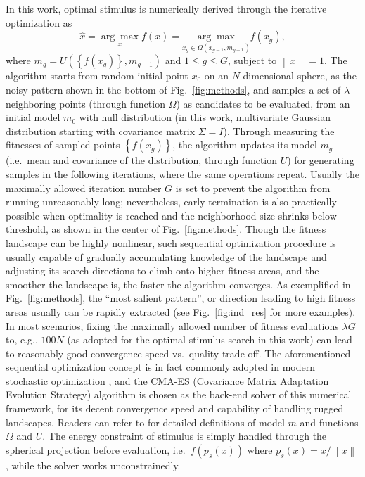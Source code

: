 In this work, optimal stimulus is numerically derived through the iterative optimization as \begin{equation} \label{eq:O1} \hat{x} = \underset{x} {\arg\max} f\left(x\right) = \underset{x_{g} \in \Omega \left( x_{g-1} , m_{g-1} \right)}{\arg\max} f\left(x_{g}\right),\end{equation} where $m_{g}=U\left(\left\lbrace f\left(x_{g}\right) \right\rbrace , m_{g-1}\right)$ and $1 \le g \le G$, subject to $\left\| x \right\| = 1$. The algorithm starts from random initial point $x_{0}$ on an $N$ dimensional sphere, as the noisy pattern shown in the bottom of Fig.~\ref{fig:methods}, and samples a set of $\lambda$ neighboring points (through function $\Omega$) as candidates to be evaluated, from an initial model $m_{0}$ with null distribution (in this work, multivariate Gaussian distribution starting with covariance matrix $\Sigma = I$). Through measuring the fitnesses of sampled points $\left\lbrace f\left(x_{g}\right) \right\rbrace$, the algorithm updates its model $m_{g}$ (i.e.~mean and covariance of the distribution, through function $U$) for generating samples in the following iterations, where the same operations repeat. Usually the maximally allowed iteration number $G$ is set to prevent the algorithm from running unreasonably long; nevertheless, early termination is also practically possible when optimality is reached and the neighborhood size shrinks below threshold, as shown in the center of Fig.~\ref{fig:methods}. Though the fitness landscape can be highly nonlinear, such sequential optimization procedure is usually capable of gradually accumulating knowledge of the landscape and adjusting its search directions to climb onto higher fitness areas, and the smoother the landscape is, the faster the algorithm converges. As exemplified in Fig.~\ref{fig:methods}, the ``most salient pattern'', or direction leading to high fitness areas usually can be rapidly extracted (see Fig.~\ref{fig:ind_res} for more examples). In most scenarios, fixing the maximally allowed number of fitness evaluations $\lambda G$ to, e.g., $100N$ (as adopted for the optimal stimulus search in this work) can lead to reasonably good convergence speed vs.~quality trade-off. The aforementioned sequential optimization concept is in fact commonly adopted in modern stochastic optimization \cite{spall2005introduction}, and the CMA-ES (Covariance Matrix Adaptation Evolution Strategy) algorithm \cite{hansen2001completely} is chosen as the back-end solver of this numerical framework, for its decent convergence speed and capability of handling rugged landscapes. Readers can refer to \cite{hansen2001completely} for detailed definitions of model $m$ and functions $\Omega$ and $U$. The energy constraint of stimulus is simply handled through the spherical projection before evaluation, i.e.~$f\left(p_s\left(x\right)\right)$ where $p_{s}\left(x\right) = {x} / {\left\|x\right\|}$, while the solver works unconstrainedly.

